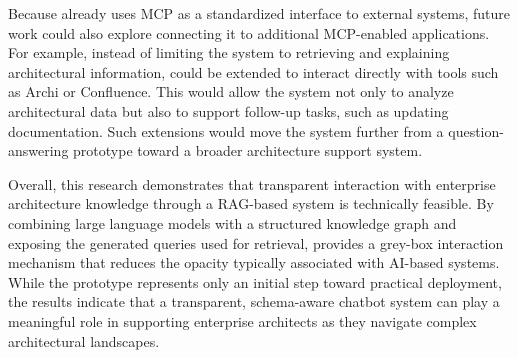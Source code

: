 Because \prototype{} already uses MCP as a standardized interface to external systems, future work could also explore connecting it to additional MCP-enabled applications. For example, instead of limiting the system to retrieving and explaining architectural information, \prototype{} could be extended to interact directly with tools such as Archi or Confluence. This would allow the system not only to analyze architectural data but also to support follow-up tasks, such as updating documentation. Such extensions would move the system further from a question-answering prototype toward a broader architecture support system.

Overall, this research demonstrates that transparent interaction with enterprise architecture knowledge through a RAG-based system is technically feasible. By combining large language models with a structured knowledge graph and exposing the generated queries used for retrieval, \prototype{} provides a grey-box interaction mechanism that reduces the opacity typically associated with AI-based systems. While the prototype represents only an initial step toward practical deployment, the results indicate that a transparent, schema-aware chatbot system can play a meaningful role in supporting enterprise architects as they navigate complex architectural landscapes.


